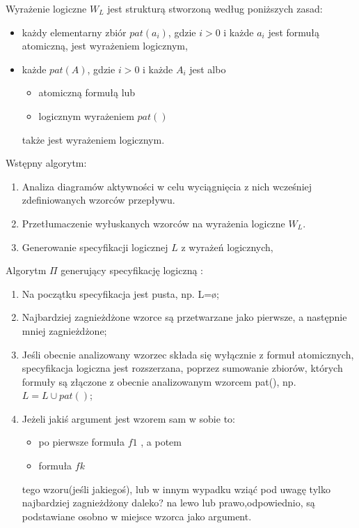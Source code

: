 \documentclass[a4paper, 11pt]{article}
\begin{document}
	\noindent Wyrażenie logiczne $W_L$ jest strukturą stworzoną według poniższych zasad:\\
	\begin{itemize}
	\item każdy elementarny zbiór $pat(a_i)$, gdzie $i>0$ i każde $a_i$ jest formułą atomiczną, jest wyrażeniem logicznym,
	\item każde $pat(A)$, gdzie $i>0$ i każde $A_i$ jest albo
	\begin{itemize}
	\item atomiczną formułą lub
	\item logicznym wyrażeniem $pat()$
	\end{itemize}
	także jest wyrażeniem logicznym.
	\end{itemize}
	\noindent Wstępny algorytm:
	\begin{enumerate}
	\item Analiza diagramów aktywności w celu wyciągnięcia z nich wcześniej zdefiniowanych wzorców przepływu.
	\item Przetłumaczenie wyłuskanych wzorców na wyrażenia logiczne $ W_L$.
	\item Generowanie specyfikacji logicznej $L$ z wyrażeń logicznych, %
	\end{enumerate}
	
 		\noindent Algorytm $\Pi$ generujący specyfikację logiczną :\\
		\begin{enumerate}
		\item Na początku specyfikacja jest pusta, np. L={\o};
		\item Najbardziej zagnieżdżone wzorce są przetwarzane jako pierwsze, a następnie mniej zagnieżdżone;
		\item Jeśli obecnie analizowany wzorzec składa się wyłącznie z formuł atomicznych, specyfikacja logiczna jest rozszerzana, poprzez sumowanie zbiorów, których formuły są złączone z obecnie analizowanym wzorcem pat(), np. $L=L \cup pat() $;
		\item Jeżeli jakiś argument jest wzorem sam w sobie to:
		\begin{itemize}
		\item po pierwsze formuła $f1$  , a potem
		\item formuła $fk$
		\end{itemize}
		tego wzoru(jeśli jakiegoś), lub w innym wypadku wziąć pod uwagę tylko najbardziej zagnieżdżony daleko? na lewo lub prawo,odpowiednio, są podstawiane osobno w miejsce wzorca jako argument.
		\end{enumerate}
\end{document}

